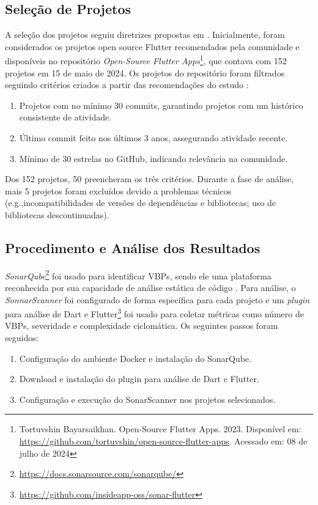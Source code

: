 \documentclass[12pt]{article}
\begin{document}
\subsection{Seleção de Projetos}
A seleção dos projetos seguiu diretrizes propostas em \cite{baltes2022sampling}. Inicialmente, foram considerados os projetos open source Flutter recomendados pela comunidade e disponíveis no repositório \textit{Open-Source Flutter Apps}\footnote{Tortuvshin Bayarsaikhan. Open-Source Flutter Apps. 2023. Disponível em: \url{https://github.com/tortuvshin/open-source-flutter-apps}. Acessado em: 08 de julho de 2024}, que contava com 152 projetos em 15 de maio de 2024. Os projetos do repositório foram filtrados seguindo critérios criados a partir das recomendações do estudo \cite{kalliamvakou2016depth}:
\begin{enumerate}
    \item Projetos com no mínimo 30 commits, garantindo projetos com um histórico consistente de atividade.
    \item Último commit feito nos últimos 3 anos, assegurando atividade recente.
    \item Mínimo de 30 estrelas no GitHub, indicando relevância na comunidade.
\end{enumerate}

Dos 152 projetos, 50 preencheram os três critérios. Durante a fase de análise, mais 5 projetos foram excluídos devido a problemas técnicos (e.g.,incompatibilidades de versões de dependências e bibliotecas; uso de bibliotecas descontinuadas).


\subsection{Procedimento e Análise dos Resultados}
\textit{SonarQube}\footnote{\url{https://docs.sonarsource.com/sonarqube/}} foi usado para identificar VBPs, sendo ele uma plataforma reconhecida por sua capacidade de análise estática de código \cite{marcilio2019static}. Para análise, o \textit{SonnarScanner} foi configurado de forma específica para cada projeto e um \textit{plugin} para análise de Dart e Flutter\footnote{\url{https://github.com/insideapp-oss/sonar-flutter}} foi usado para coletar métricas como número de VBPs, severidade e complexidade ciclomática. Os seguintes passos foram seguidos:
\begin{enumerate}
    \item Configuração do ambiente Docker e instalação do SonarQube.
    \item Download e instalação do plugin para análise de Dart e Flutter.
    \item Configuração e execução do SonarScanner nos projetos selecionados.
\end{enumerate}
 
\end{document}
